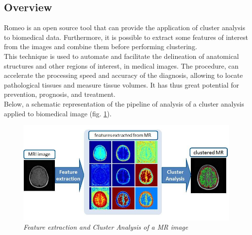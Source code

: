 \subsection{Overview}
\label{overview}
Romeo is an open source tool that can provide the application of cluster analysis to biomedical data. Furthermore, it is possible to extract some features\g{} of interest from the images and combine them before performing clustering.\\
This technique is used to automate and facilitate the delineation of anatomical structures and other regions of interest, in medical images. The procedure, can accelerate the processing speed and accuracy of the diagnosis, allowing to locate pathological 	tissues and measure tissue volumes. It has thus great potential for
prevention, prognosis, and treatment.\\
Below, a schematic representation of the pipeline of analysis of a cluster analysis applied to biomedical image (fig. \ref{pipeline}).
\begin{figure}[!h]
\centering
	\includegraphics[scale=0.5]{./Images/pipe}
	\caption{\textit{Feature extraction and Cluster Analysis of a MR image}}
	\label{pipeline}
\end{figure}


